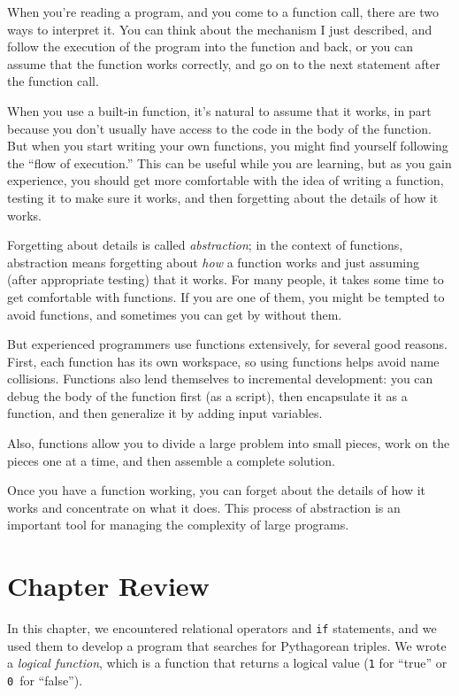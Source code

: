 \documentclass[../../book.tex]{subfiles}
\begin{document}
When you're reading a program, and you come to a function call,
there are two ways to interpret it. You can think about the mechanism I just described,
and follow the execution of the program into the function and back, or you can assume that the function works correctly, and go on to the next statement after the function call.

When you use a built-in function, it's natural to assume that it works, in part because you don't
usually have access to the code in the body of the function.
But when you start writing your own functions, you might
find yourself following the ``flow of execution.''  This can
be useful while you are learning, but as you gain experience, you
should get more comfortable with the idea of writing a function,
testing it to make sure it works, and then forgetting about the
details of how it works.


Forgetting about details is called \emph{abstraction}; in the context
of functions, abstraction means forgetting about \emph{how} a function
works and just assuming (after appropriate testing) that it works.
For many people, it takes some time to get comfortable with functions.  If you are one of them, you might be tempted to avoid functions, and sometimes you can get by without them.

But experienced programmers use functions extensively, for several good reasons. First, each function has its own workspace, so using functions helps
avoid name collisions.
Functions also lend themselves to incremental development: you can
debug the body of the function first (as a script), then encapsulate
it as a function, and then generalize it by adding input variables.

Also, functions allow you to divide a large problem into small
pieces, work on the pieces one at a time, and then assemble a
complete solution.

Once you have a function working, you can forget about the
details of how it works and concentrate on what it does.  This
process of abstraction is an important tool for managing the
complexity of large programs.


\section{Chapter Review}

In this chapter, we encountered relational operators and \lstinline{if} statements, and we used them to develop a program that searches for Pythagorean triples.
We wrote a \emph{logical function}, which is a function that returns a logical value
(\lstinline{1} for ``true'' or \lstinline{0}~for ``false'').
\end{document}
